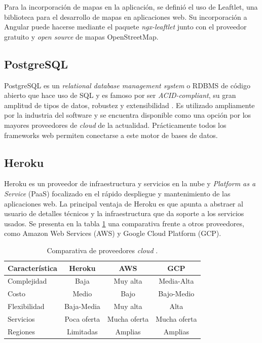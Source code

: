 Para la incorporación de mapas en la aplicación, se definió el uso de Leaftlet, una biblioteca para el desarrollo de mapas en aplicaciones web. Su incorporación a Angular puede hacerse mediante el paquete \textit{ngx-leaftlet} \citep{LEAFLET:1} junto con el proveedor gratuito y \textit{open source} de mapas OpenStreetMap.

\subsection{PostgreSQL}

PostgreSQL es un \textit{relational database management system} o RDBMS de código abierto que hace uso de SQL y es famoso por ser \textit{ACID-compliant}, su gran amplitud de tipos de datos, robustez y extensibilidad \citep{POSTGRES:1}. Es utilizado ampliamente por la industria del software \citep{POSTGRES:2} y se encuentra disponible como una opción por los mayores proveedores de \textit{cloud} de la actualidad. Prácticamente todos los frameworks web permiten conectarse a este motor de bases de datos. 

\subsection{Heroku}

Heroku es un proveedor de infraestructura y servicios en la nube y \textit{Platform as a Service} (PaaS) focalizado en el rápido despliegue y mantenimiento de las aplicaciones web. La principal ventaja de Heroku es que apunta a abstraer al usuario de detalles técnicos y la infraestructura que da soporte a los servicios usados. Se presenta en la tabla \ref{tab:comparativa-cloud} una comparativa frente a otros proveedores, como Amazon Web Services (AWS) y Google Cloud Platform (GCP).


\begin{table}[H]
	\centering
	\caption[Comparativa de proveedores \textit{cloud}.]{Comparativa de proveedores \textit{cloud} \citep{CLOUD:1}\citep{CLOUD:2}\citep{CLOUD:3}.}
	\begin{tabular}{l c c c}    
		\toprule
		\textbf{Característica} 	 & \textbf{Heroku} & \textbf{AWS} & \textbf{GCP} \\
		\midrule
		Complejidad & Baja & Muy alta & Media-Alta \\		
		Costo & Medio & Bajo & Bajo-Medio			\\		
		Flexibilidad & Baja-Media & Muy alta & Alta \\
		Servicios & Poca oferta & Mucha oferta & Mucha oferta 	\\
		Regiones & Limitadas & Amplias & Amplias \\
		\bottomrule
		\hline
	\end{tabular}
	\label{tab:comparativa-cloud}
\end{table}

